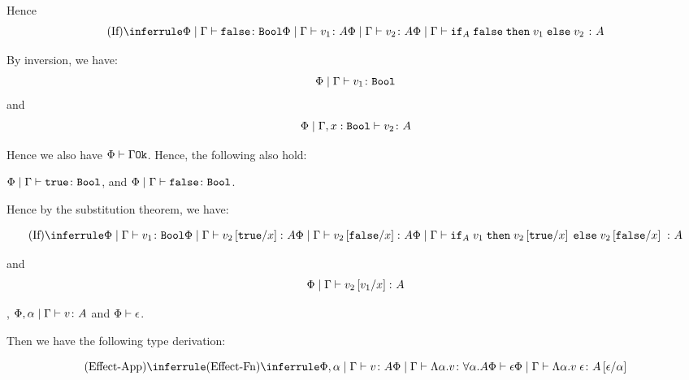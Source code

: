 {        Hence 
        \begin{equation}
            \ntreeruleIII{If}{
                \gpetyperelation{\f}{\B}
                }{
                \gpetyperelation{v_1}{A}
                }{
                \gpetyperelation{v_2}{A}
            }{
                \gpetyperelation{\pifthenelse{A}{\f}{v_1}{v_2}}{A}
            }
    \end{equation}

        By inversion, we have:
        \begin{equation}
            \gpetyperelation{v_1}{\B}
        \end{equation}
        and
        \begin{equation}
            \etyperelation{\P}{\G, x:\B}{v_2}{A}
        \end{equation}
        
        Hence we also have $\wellformedok{\P}{\G}$. Hence, the following also hold:

        $\gpetyperelation{\t}{\B}$, and $\gpetyperelation{\f}{\B}$.

        Hence by the substitution theorem, we have:

        \begin{equation}
            \ntreeruleIII{If}{
                \gpetyperelation{v_1}{\B}
                }{
                \gpetyperelation{v_2\ssub{x}{\t}}{A}
                }{
                \gpetyperelation{v_2\ssub{x}{\f}}{A}
            }{\gpetyperelation{\pifthenelse{A}{v_1}{v_2\ssub{x}{\t}}{v_2\ssub{x}{\f}}}{A}
            }
        \end{equation}

        and 
        \begin{equation}
            \gpetyperelation{v_2\ssub{x}{v_1}}{A}
        \end{equation}

        \bi, $\etyperelation{\P,\a}{\G}{v}{A}$ and $\wellformed{\P}{\e}$.

        Then we have the following type derivation:

        \begin{equation}
            \ntreeruleII{Effect-App}{
                \ntreeruleI{Effect-Fn}{\etyperelation{\P,\a}{\G}{v}{A}}{\gpetyperelation{\elam{\a}{v}}{\all{\a}{A}}}
                }{
                \wellformed{\P}{\e}
            }{\gpetyperelation{\eapp{\elam{\a}{v}}{\e}}{A\ssub{\a}{\e}}}            
        \end{equation}

}
